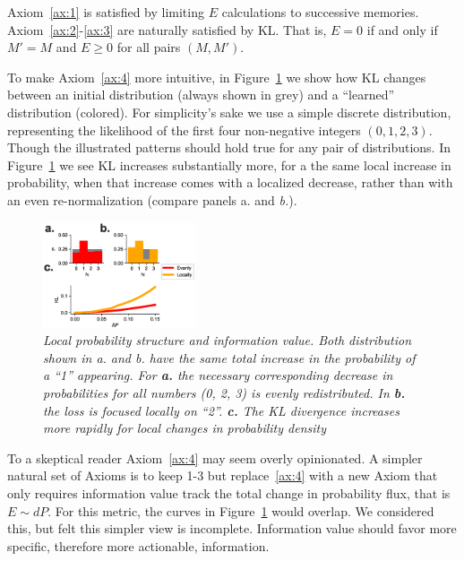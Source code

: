 \documentclass[9pt,twocolumn,twoside]{pnas-new}
\begin{document}
Axiom~\ref{ax:1} is satisfied by limiting $E$ calculations to successive memories. Axiom~\ref{ax:2}-\ref{ax:3} are naturally satisfied by KL. That is, $E = 0$ if and only if $M' = M$ and $E \geq 0$ for all pairs $(M, M')$.

To make Axiom~\ref{ax:4} more intuitive, in Figure~\ref{fig:metrics_specifity} we show how KL changes between an initial distribution (always shown in grey) and a ``learned'' distribution (colored). For simplicity's sake we use a simple discrete distribution, representing the likelihood of the first four non-negative integers $(0,1,2,3)$. Though the illustrated patterns should hold true for any pair of distributions. In Figure~\ref{fig:metrics_specifity} we see KL increases substantially more, for a the same local increase in probability, when that increase comes with a localized decrease, rather than with an even re-normalization (compare panels \textit{}{a.} and \textit{b.}).

\begin{figure}
\includegraphics[width=0.4\textwidth]{figures/metrics_specifity.eps}
\caption{
\textit{Local probability structure and information value. Both distribution shown in a. and b. have the same total increase in the probability of a ``1'' appearing.
For \textbf{a.}  the necessary corresponding decrease in probabilities for all numbers (0, 2, 3) is evenly redistributed.
In \textbf{b.} the loss is focused locally on ``2''. 
\textbf{c.} The KL divergence increases more rapidly for local changes in probability density}}
\label{fig:metrics_specifity}
\end{figure}

To a skeptical reader Axiom~\ref{ax:4} may seem overly opinionated. A simpler natural set of Axioms is to keep 1-3 but replace~\ref{ax:4} with a new Axiom  that only requires information value track the total change in probability flux, that is $E \sim dP$. For this metric, the curves in Figure~\ref{fig:metrics_specifity} would overlap. We considered this, but felt this simpler view is incomplete. Information value should favor more specific, therefore more actionable, information. 
\end{document}
